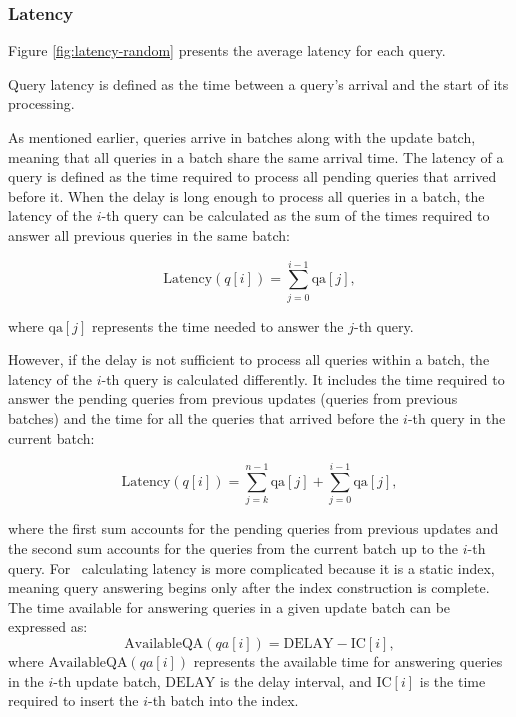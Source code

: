 \subsubsection{Latency}

Figure \ref{fig:latency-random} presents the average latency for each query. 

\begin{definition}
Query latency is defined as the time between a query's arrival and the start of its processing.
\end{definition}

As mentioned earlier, queries arrive in batches along with the update batch, meaning 
that all queries in a batch share the same arrival time. The latency of a query is 
defined as the time required to process all pending queries that arrived before it.
%
When the delay is long enough to process all queries in a batch, the latency of the 
$i$-th query can be calculated as the sum of the times required to answer all previous 
queries in the same batch:

\[
\text{Latency}(q[i]) = \sum_{j=0}^{i-1} \text{qa}[j],
\]

where $\text{qa}[j]$ represents the time needed to answer the $j$-th query.

However, if the delay is not sufficient to process all queries within a batch, 
the latency of the $i$-th query is calculated differently. It includes the time 
required to answer the pending queries from previous updates (queries from previous batches) 
and the time for all the queries that arrived before the $i$-th query in the current batch:

\[
\text{Latency}(q[i]) = \sum_{j=k}^{n-1} \text{qa}[j] + \sum_{j=0}^{i-1} \text{qa}[j],
\]

where the first sum accounts for the pending queries from previous updates
and the second sum accounts for the queries from the current batch up to the $i$-th query.
%
For \Fresh\, calculating latency is more complicated because it is a static index, meaning 
query answering begins only after the index construction is complete. The time available 
for answering queries in a given update batch can be expressed as:
\[
\text{AvailableQA}(qa[i]) = \text{DELAY} - \text{IC}[i],
\]
where $\text{AvailableQA}(qa[i])$ represents the available time for answering queries 
in the $i$-th update batch, $\text{DELAY}$ is the delay interval, and $\text{IC}[i]$ 
is the time required to insert the $i$-th batch into the index.

